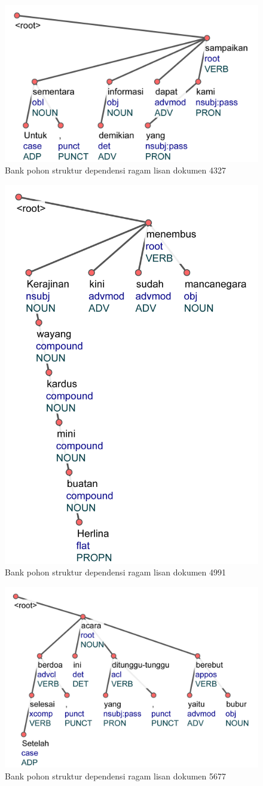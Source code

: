 \begin{figure}
	\centering \includegraphics[width=0.5
	\textwidth] {pics/lampiran/lampiranls4327.jpg} 
	\caption{Bank pohon struktur dependensi ragam lisan dokumen 4327} 
	\label{fig:lampiranls4327} 
\end{figure}

\begin{figure}
	\centering \includegraphics[width=0.45
	\textwidth] {pics/lampiran/lampiranls4991.jpg} 
	\caption{Bank pohon struktur dependensi ragam lisan dokumen 4991} 
	\label{fig:lampiranls4991} 
\end{figure}

\begin{figure}
	\centering \includegraphics[width=0.6
	\textwidth] {pics/lampiran/lampiranls5677.jpg} 
	\caption{Bank pohon struktur dependensi ragam lisan dokumen 5677} 
	\label{fig:lampiranls5677} 
\end{figure}

